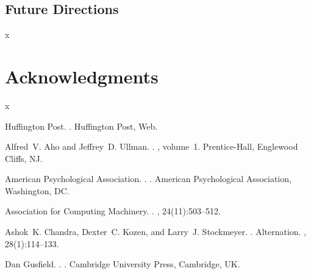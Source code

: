 \documentclass[11pt,letterpaper]{article}
\begin{document}
	\subsection{Future Directions}
	
	x
	
	\section*{Acknowledgments}
	
	x
	
	\begin{thebibliography}{}
		
		{Huffington Post}.
		.
		\newblock Huffington Post, Web.
		
		Alfred~V. Aho and Jeffrey~D. Ullman.
		.
		, volume~1.
		\newblock Prentice-{Hall}, Englewood Cliffs, NJ.
		
		{American Psychological Association}.
		.
		.
		\newblock American Psychological Association, Washington, DC.
		
		{Association for Computing Machinery}.
		.
		, 24(11):503--512.
		
		Ashok~K. Chandra, Dexter~C. Kozen, and Larry~J. Stockmeyer.
		.
		\newblock Alternation.
		,
		28(1):114--133.
		
		Dan Gusfield.
		.
		.
		\newblock Cambridge University Press, Cambridge, UK.
		
	\end{thebibliography}
	
\end{document}

